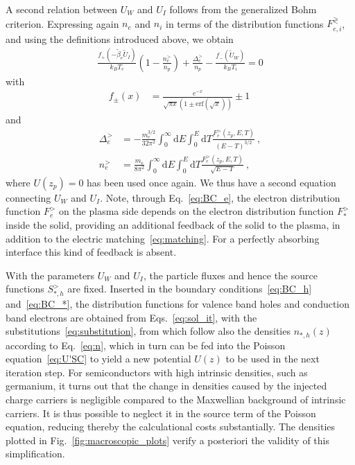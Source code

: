 \documentclass[pre,reprint,floats]{revtex4-1}
\newcommand{\rmd}{\ensuremath{\mathrm{d}}}
\begin{document}
A second relation between $U_W$ and $U_I$ follows from the generalized Bohm criterion. 
Expressing again $n_{e}$ and $n_i$ in terms of the distribution functions $F_{e,i}^\gtrless$, 
and using the definitions introduced above, we obtain
\begin{align}\label{eq:GBC_f}
\frac{f_+\left(-\tilde{\beta}_e\tilde{U}_I\right)}{k_B T_e}\left(1 - \frac{n_e^>}{n_p}\right) 
+ \frac{\Delta_e^>}{n_p} - \frac{f_-\left(\tilde{U}_W\right)}{k_B T_i} = 0 
\end{align}
with
\begin{align}
f_\pm (x) &= \frac{e^{-x}}{\sqrt{\pi x}(1 \pm \mathrm{erf}(\sqrt x))} \pm 1~
\end{align}
and 
\begin{align}
\Delta_e^> &= -\frac{m_e^{3/2}}{32\pi^2}\int_{0}^\infty\rmd E\int_0^{E} \rmd T \frac{F_e^>(z_p,E,T)}{(E-T)^{3/2}}~,\\
n_e^> &= \frac{m_e}{8\pi^2}\int_{0}^\infty\rmd E\int_0^{E} \rmd T \frac{F_e^>(z_p,E,T)}{\sqrt{E-T}}~,
\end{align}
where $U(z_p)=0$ has been used once again. We thus have a second
equation connecting $U_W$ and $U_I$. Note, through Eq.~\eqref{eq:BC_e}, the electron distribution function 
$F_e^>$ on the plasma side depends on the electron distribution function $F_*^>$ inside the solid, providing 
an additional feedback of the solid to the plasma, in addition to the electric matching~\eqref{eq:matching}.
For a perfectly absorbing interface this kind of feedback is absent.

With the parameters $U_W$ and $U_I$, the particle fluxes and hence the source 
functions $S_{*,h}^>$ are fixed. Inserted in the boundary conditions~\eqref{eq:BC_h}  
and~\eqref{eq:BC_*}, the distribution functions for valence band holes and conduction band electrons 
are obtained from Eqs.~\eqref{eq:sol_it}, with the substitutions~\eqref{eq:substitution}, from which 
follow also the densities $n_{*,h}(z)$ according to Eq.~\eqref{eq:n}, which in turn can be fed into the 
Poisson equation~\eqref{eq:U'SC} to yield a new potential $U(z)$ to be used in the next iteration
step. For semiconductors with high intrinsic densities, such as germanium, it turns out that the 
change in densities caused by the injected charge carriers is negligible compared to the Maxwellian 
background of intrinsic carriers. It is thus possible to neglect it in the source term of the Poisson 
equation, reducing thereby the calculational costs substantially. The densities plotted in 
Fig.~\ref{fig:macroscopic_plots} verify a posteriori the validity of this simplification.
\end{document}
